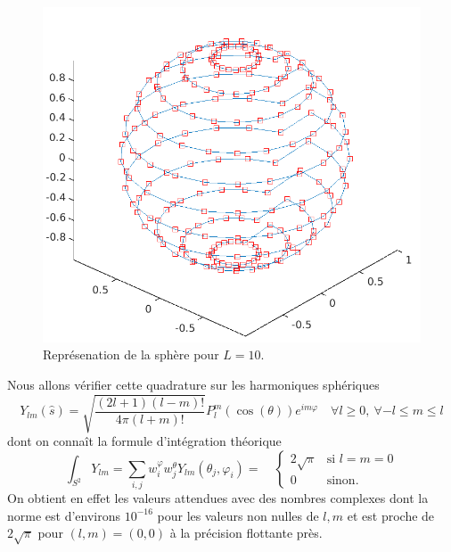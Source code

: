 \documentclass[11pt]{article}
\newcommand{\hs}{\hat{s}}
\begin{document}
\begin{figure}
  \centering
  \includegraphics[height=0.4\textheight]{sphere}
  \caption{Représenation de la sphère pour $L=10$.}
  \label{fig:sph}
\end{figure}

Nous allons vérifier cette quadrature sur les harmoniques sphériques
\[
  Y_{lm}(\hs) = \sqrt{\frac{(2l+1)(l-m)!}{4\pi(l+m)!}} P^m_l(\cos(\theta)) e^{im\varphi} \quad \forall l \geq 0,~ \forall -l \leq m \leq l
\]
dont on connaît la formule d'intégration théorique
\[
  \int_{S^2} Y_{lm} = \sum_{i,j} w^\varphi_i w^\theta_j Y_{lm}(\theta_j, \varphi_i) = \quad
  \begin{cases}
    2\sqrt{\pi} & \text{si } l=m=0 \\
    0 & \text{sinon.}
  \end{cases}
\]
On obtient en effet les valeurs attendues avec des nombres complexes dont la norme est d'environs $10^{-16}$ pour les valeurs non nulles de
$l, m$ et est proche de $2\sqrt{\pi}$ pour $(l, m) = (0,0)$ à la précision flottante près.
\end{document}
